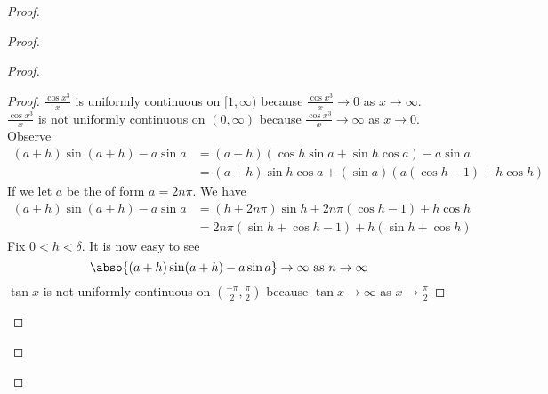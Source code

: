\documentclass{report}
\begin{document}
\begin{proof}
\begin{proof}
\begin{proof}
\begin{proof}
$\frac{\cos x^3}{x}$ is uniformly continuous on $[1,\infty)$ because $\frac{\cos x^3}{x}\to 0$ as $x\to \infty$.\\

$\frac{\cos x^3}{x}$ is not uniformly continuous on $(0,\infty)$ because $\frac{\cos x^3}{x}\to \infty$ as $x\to 0$.\\

Observe 
\begin{align*}
  (a+h)\sin (a+h)- a\sin a &=(a+h)(\cos h \sin a +\sin h \cos a)-a \sin a\\
  &=(a+h)\sin h \cos a + (\sin a)(a(\cos h-1)+h \cos h)
\end{align*}
If we let $a$ be the of form $a=2n\pi $. We have 
\begin{align*}
  (a+h)\sin (a+h)-a \sin a&=(h+2n\pi)\sin h+ 2n\pi (\cos h-1)+h \cos h\\
  &=2n \pi (\sin h +\cos h-1)+h (\sin h+\cos h)
\end{align*}
Fix $0<h<\delta$. It is now easy to see 
 \begin{equation*}
   \abso{(a+h)\sin (a+h)-a \sin a}\to \infty\text{ as $n \to \infty$ }
\end{equation*}
$\tan x$ is not uniformly continuous on  $(\frac{-\pi}{2},\frac{\pi}{2})$ because $\tan x \to \infty$ as $x\to \frac{\pi}{2}$
\end{proof}




\end{proof}
\end{proof}
\end{proof}
\end{document}

